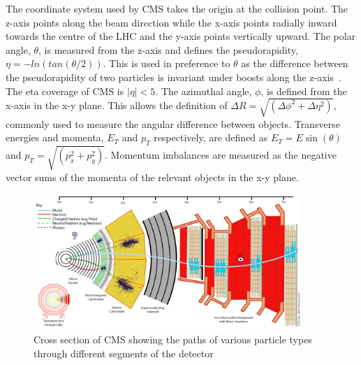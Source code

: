 The coordinate system used by CMS takes the origin at 
the collision point. The z-axis points along the beam direction while the x-axis points radially inward
towards the centre of the LHC and the y-axis points vertically upward.
The polar angle, $\theta$, is measured from the z-axis and defines the pseudorapidity, $\eta=-ln(tan(\theta/2))$. 
This is used in preference to $\theta$ as the difference between the pseudorapidity of two 
particles is invariant under boosts along the z-axis~\cite{cms_iop}. 
The eta coverage of CMS is $|\eta|<5$. The azimuthal angle, $\phi$, is defined from the x-axis in the x-y plane.
This allows the definition of $\Delta R = \sqrt{(\Delta\phi^2+\Delta\eta^2)}$, commonly used to measure the 
angular difference between objects. Transverse energies and momenta, $E_T $ and $p_T$ respectively, are defined 
as $E_T = E\sin(\theta)$ and $p_T = \sqrt{(p_{x}^2+p_{y}^2)}$. Momentum imbalances are measured as the negative 
vector sums of the momenta of the relevant objects in the x-y plane. 

\begin{figure}
\centering
    \includegraphics[width=0.9\textwidth]{./Figures/detector/CMS_Slice.jpg}
  \caption{Cross section of CMS showing the paths of various particle types 
  through different segments of the detector~\cite{cmsslice}}
  \label{CMS_SLICE}
\end{figure}


